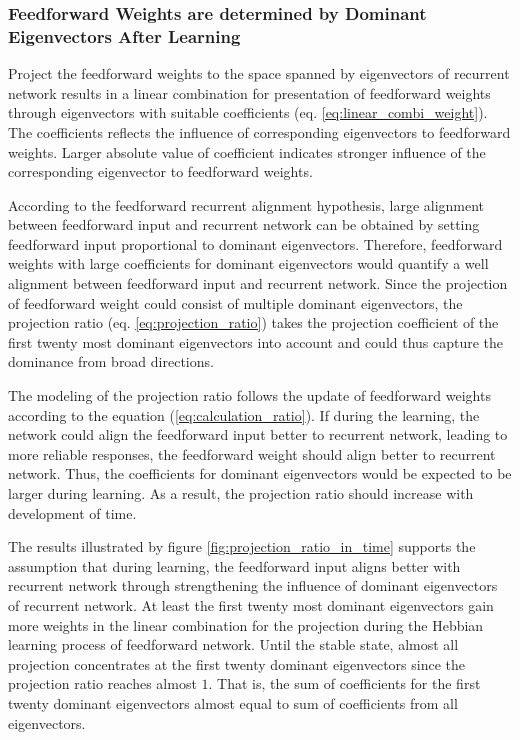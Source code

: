 \documentclass[11pt]{article}
\begin{document}
	\subsubsection{Feedforward Weights are determined by Dominant Eigenvectors After Learning}
	
	Project the feedforward weights to the space spanned by eigenvectors of recurrent network results in a linear combination for presentation of feedforward weights through eigenvectors with suitable coefficients (eq. \ref{eq:linear_combi_weight}). The coefficients reflects the influence of corresponding eigenvectors to feedforward weights. Larger absolute value of coefficient indicates stronger influence of the corresponding eigenvector to feedforward weights. 
	
	According to the feedforward recurrent alignment hypothesis, large alignment between feedforward input and recurrent network can be obtained by setting feedforward input proportional to dominant eigenvectors. 
	Therefore, feedforward weights with large coefficients for dominant eigenvectors would quantify a well alignment between feedforward input and recurrent network. Since the projection of feedforward weight could consist of multiple dominant eigenvectors, the projection ratio (eq. \ref{eq:projection_ratio}) takes the projection coefficient of the first twenty most dominant eigenvectors into account and could thus capture the dominance from broad directions. 
	
	The modeling of the projection ratio follows the update of feedforward weights according to the equation (\ref{eq:calculation_ratio}). If during the learning, the network could align the feedforward input better to recurrent network, leading to more reliable responses, the feedforward weight should align better to recurrent network. Thus, the coefficients for dominant eigenvectors would be expected to be larger during learning. As a result, the projection ratio should increase with development of time. 
	
	The results illustrated by figure \ref{fig:projection_ratio_in_time} supports the assumption that during learning, the feedforward input aligns better with recurrent network through strengthening the influence of dominant eigenvectors of recurrent network. At least the first twenty most dominant eigenvectors gain more weights in the linear combination for the projection during the Hebbian learning process of feedforward network. Until the stable state, almost all projection concentrates at the first twenty dominant eigenvectors since the projection ratio reaches almost $1$. That is, the sum of coefficients for the first twenty dominant eigenvectors almost equal to sum of coefficients from all eigenvectors. 
	
\end{document}
